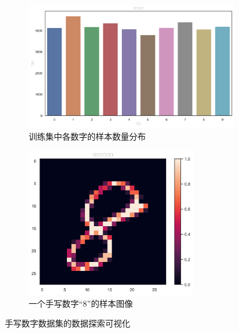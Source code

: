 \begin{itemize}
        \begin{figure}[H]
            \centering
            \begin{subfigure}[b]{0.48\textwidth}
                \centering
                \includegraphics[width=\textwidth]{figures/digit_distribution.png}
                \caption{训练集中各数字的样本数量分布}
                \label{fig:digit_distribution}
            \end{subfigure}
            \hfill
            \begin{subfigure}[b]{0.48\textwidth}
                \centering
                \includegraphics[width=0.8\textwidth]{figures/sample_digit.png}
                \caption{一个手写数字“8”的样本图像}
                \label{fig:sample_digit}
            \end{subfigure}
            \caption{手写数字数据集的数据探索可视化}
            \label{fig:digit_exploration}
        \end{figure}


\end{itemize}
